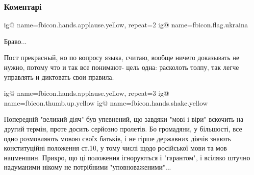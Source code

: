  
 
 
 
 
\subsubsection{Коментарі}

\begin{itemize}

\ifcmt
  ig@ name=fbicon.hands.applause.yellow, repeat=2
  ig@ name=fbicon.flag.ukraina
\fi

 
Браво...

 

Пост прекрасный, но по вопросу языка, считаю, вообще ничего доказывать не
нужно, потому что и так все понимают- цель одна: расколоть толпу, так легче
управлять и диктовать свои правила.


\ifcmt
  ig@ name=fbicon.hands.applause.yellow, repeat=3
  ig@ name=fbicon.thumb.up.yellow
  ig@ name=fbicon.hands.shake.yellow
\fi


Попередній "великий діяч" був упевнений, що завдяки "мові і віри" вскочить на
другий термін, проте досить серйозно пролетів. Бо громадяни, у більшості, все
одно розмовляють мовою своїх батьків, і не гірше державних діячів знають
конституційні положення ст.10, у тому числі щодо російської мови та мов
нацменшин. Прикро, що ці положення ігноруються і "гарантом", і всіляко штучно
надуманими нікому не потрібними "уповноваженими"...


\end{itemize}
